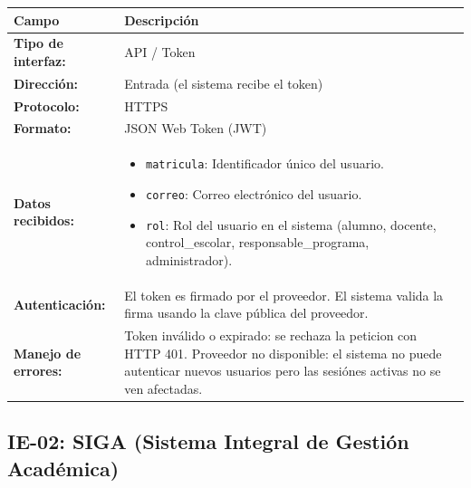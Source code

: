 \begin{table}[H]
\centering
\begin{tabular}{|L{3.5cm}|L{10cm}|}
    \hline
    \textbf{Campo} & \textbf{Descripción} \\
    \hline
    \textbf{Tipo de interfaz:} & API / Token \\
    \hline
    \textbf{Dirección:} & Entrada (el sistema recibe el token) \\
    \hline
    \textbf{Protocolo:} & HTTPS \\
    \hline
    \textbf{Formato:} & JSON Web Token (JWT) \\
    \hline
    \textbf{Datos recibidos:} &
    \begin{itemize}[nosep, leftmargin=*]
        \item \texttt{matricula}: Identificador único del usuario.
        \item \texttt{correo}: Correo electrónico del usuario.
        \item \texttt{rol}: Rol del usuario en el sistema (alumno, docente, control\_escolar, responsable\_programa, administrador).
    \end{itemize} \\
    \hline
    \textbf{Autenticación:} & El token es firmado por el proveedor. El sistema valida la firma usando la clave pública del proveedor. \\
    \hline
    \textbf{Manejo de errores:} & Token inválido o expirado: se rechaza la peticion con HTTP 401. Proveedor no disponible: el sistema no puede autenticar nuevos usuarios pero las sesiónes activas no se ven afectadas. \\
    \hline
\end{tabular}
\end{table}

\subsection{IE-02: SIGA (Sistema Integral de Gestión Académica)}


